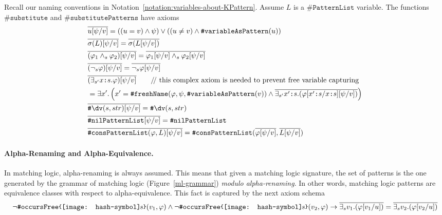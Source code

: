 \documentclass[UTF8,11pt]{article}
\theoremstyle{plain}
\theoremstyle{definition}
\theoremstyle{remark}
\newcommand{\cln}{\texttt{:}}
\newcommand{\parametric}[2]{{#1}\raisebox{.2ex}{\texttt{\footnotesize{\{}}}#2\raisebox{.2ex}{\texttt{\footnotesize{\}}}}}
\newcommand{\doubleslash}{/\!/{ }}
\newcommand{\shp}{\texttt{[image: hash-symbol]}\kern-0.1em}
\newcommand{\sharpsymbol}{\#}
\newcommand{\shs}{\shp s}
\newcommand{\KPatternList}{\texttt{\sharpsymbol PatternList}}
\newcommand{\KnilKPatternList}{\texttt{\sharpsymbol nilPatternList}}
\newcommand{\KconsKPatternList}{\texttt{\sharpsymbol consPatternList}}
\newcommand{\KVariableAsKPattern}{\texttt{\sharpsymbol variableAsPattern}}
\newcommand{\Kdv}{\texttt{\sharpsymbol \slashsymbol dv}}
\newcommand{\KoccursFree}{\texttt{\sharpsymbol occursFree}}
\newcommand{\KfreshName}{\texttt{\sharpsymbol freshName}}
\newcommand{\Ksubstitute}{\texttt{\sharpsymbol substitute}}
\newcommand{\KsubstitutePatterns}{\texttt{\sharpsymbol substitutePatterns}}
\newcommand{\slashsymbol}{\symbol{92}}
\begin{document}
Recall our naming conventions in 
Notation~\ref{notation:variables-about-KPattern}.
Assume $L$ is a $\KPatternList$ variable.
The functions $\Ksubstitute$ and $\KsubstitutePatterns$ have axioms
\begin{align*}
  & \overline{u [\psi / v]} 
  = ((u = v) \wedge \psi)
  \vee ((u \neq v) \wedge \KVariableAsKPattern(u))
  \\
  & \overline{\sigma(L)[\psi / v]} =
  \overline{\sigma(L[\psi / v])}
  \\
  & \overline{(\varphi_1 \wedge_{s} \varphi_2) [\psi / v]} = 
  \overline{\varphi_1[\psi / v] \wedge_{s} \varphi_2[\psi / v]}
  \\
  & \overline{(\neg_{s} \varphi)[\psi / v]} = \overline{\neg_{s} \varphi[\psi 
  / v]}
  \\
  & \overline{(\exists_{s'} x \cln s . \varphi)[\psi/v]} 
  \qquad \text{\doubleslash this complex axiom is needed to 
  	prevent {free variable capturing}}\\
  & = \exists x' . \left(x' = \KfreshName(\varphi, \psi, 
  \KVariableAsKPattern(v)) \wedge \overline{\exists_{s'} x' \cln s . 
  (\varphi[x' \cln s / x \cln s][\psi/v])}\right)
  \\
  & \overline{\Kdv(s,str)[\psi/v]} =
    \Kdv(s,str)
  \\
  & \overline{\KnilKPatternList[\psi / v]} = \KnilKPatternList
  \\
  & \overline{\KconsKPatternList(\varphi, L)[\psi / v]} = 
  \KconsKPatternList(\overline{\varphi[\psi / v]}, \overline{L[\psi / v]})
\end{align*}


\paragraph{Alpha-Renaming and Alpha-Equivalence.}
In matching logic, alpha-renaming is always assumed.
This means that given a matching logic signature, the set of patterns is the 
one generated by the grammar of matching logic (Figure~\ref{ml-grammar})
\emph{modulo alpha-renaming}.
In other words, matching logic patterns are equivalence classes with respect to alpha-equivalence.
This fact is captured by the next axiom schema
$$
\neg \parametric{\KoccursFree}{\shs}(v_1, \varphi) \wedge 
\neg \parametric{\KoccursFree}{\shs}(v_2, \varphi) \to 
\overline{\exists_s v_1 .(\varphi[v_1 / u])} = 
\overline{\exists_s v_2 .(\varphi[v_2 / u])}
$$
\end{document}
